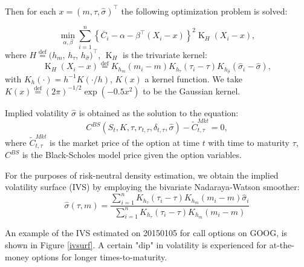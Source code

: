 \documentclass[a4paper,12pt]{article}
\theoremstyle{plain}
\theoremstyle{definition}
\begin{document}
Then for each $x = (m, \tau, \widehat{\sigma})^{\top}$ the following optimization problem is solved:

\begin{equation}
\underset{\alpha, \beta}{\min} \sum_{i=1}^n \left\{ \overline{C}_i - \alpha - \beta^{\top}(X_i - x) \right\}^2 \operatorname{K}_{H}(X_i - x),
\label{loc_lin_reg}
\end{equation}
where  $H \stackrel{\operatorname{def}}{=} (h_{m}$, $h_{\tau}$, $h_{\widehat{\sigma}})^{\top}$, $\operatorname{K}_{H}$ is the trivariate kernel:
\begin{equation}
\operatorname{K}_{H}(X_i - x) \stackrel{\operatorname{def}}{=} K_{h_{m}}(m_i - m) K_{h_{\tau}}(\tau_i - \tau) K_{h_{\widehat{\sigma}}}(\widehat{\sigma}_i - \widehat{\sigma}),
\end{equation}
with $K_h(\cdot) = h^{-1}K(\cdot/h)$, $K(x)$ a kernel function. We take $K(x) \stackrel{\operatorname{def}}{=} (2\pi)^{-1/2}\exp(-0.5 x^2)$ to be the Gaussian kernel.

Implied volatility $\widehat{\sigma}$ is obtained as the solution to the equation:
\begin{equation}
C^{BS}(S_t, K, \tau, r_{t,\tau}, \delta_{t,\tau}, \widehat{\sigma}) - \tilde{C}^{Mkt}_{t, \tau} = 0,
\end{equation} 
where $\tilde{C}^{Mkt}_{t, \tau}$ is the market price of the option at time $t$ with time to maturity $\tau$, $C^{BS}$ is the Black-Scholes model price given the option variables.

For the purposes of risk-neutral density estimation, we obtain the implied volatility surface (IVS) by employing the bivariate Nadaraya-Watson smoother:
\begin{equation}
\widehat{\sigma}(\tau, m) = \frac{ \sum_{i=1}^{n} K_{h_{\tau}}(\tau_i - \tau) K_{h_{m}}(m_i - m) \widehat{\sigma}_i }{ \sum_{i=1}^{n} K_{h_{\tau}}(\tau_i - \tau) K_{h_{m}}(m_i - m) }
\end{equation}

An example of the IVS estimated on 20150105 for call options on GOOG, is shown in Figure \ref{ivsurf}. A certain "dip" in volatility is experienced for at-the-money options for longer times-to-maturity.
\end{document}
